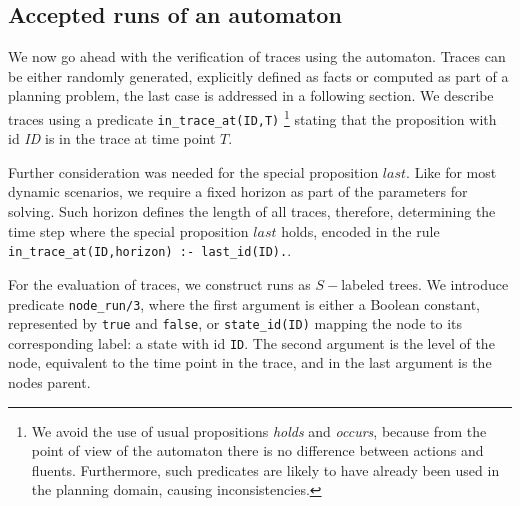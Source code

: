\subsection{Accepted runs of an automaton  }

We now go ahead with the verification of traces using the automaton. Traces can be either randomly generated, explicitly defined as facts or computed as part of a planning problem, the last case is addressed in a following section. We describe traces using a predicate \texttt{in\_trace\_at(ID,T)} \footnote{We avoid the use of usual propositions \textit{holds} and \textit{occurs}, because from the point of view of the automaton there is no difference between actions and fluents. Furthermore, such predicates are likely to have already been used in the planning domain, causing inconsistencies.} stating that the proposition with id \textit{ID} is in the trace at time point $T$.

Further consideration was needed for the special proposition $\mathit{last}$. Like for most dynamic scenarios, we require a fixed horizon as part of the parameters for solving. Such horizon defines the length of all traces, therefore, determining the time step where the special proposition $\mathit{last}$ holds, encoded in the rule \texttt{in\_trace\_at(ID,horizon) :- last\_id(ID).}.

For the evaluation of traces, we construct runs as $S-$labeled trees. We introduce predicate \texttt{node\_run/3}, where the first argument is either a Boolean constant, represented by \texttt{true} and \texttt{false}, or \texttt{state\_id(ID)} mapping the node to its corresponding label: a state with id \texttt{ID}. The second argument is the level of the node, equivalent to the time point in the trace, and in the last argument is the nodes parent.

